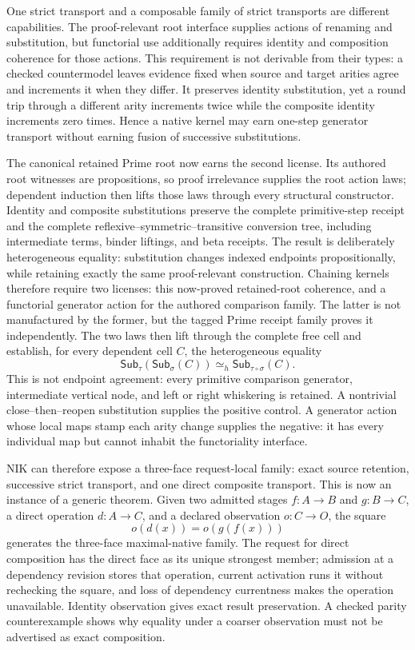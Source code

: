 \documentclass[11pt]{article}
\begin{document}
One strict transport and a composable family of strict transports are
different capabilities.  The proof-relevant root interface supplies actions
of renaming and substitution, but functorial use additionally requires
identity and composition coherence for those actions.  This requirement is
not derivable from their types: a checked countermodel leaves evidence fixed
when source and target arities agree and increments it when they differ.  It
preserves identity substitution, yet a round trip through a different arity
increments twice while the composite identity increments zero times.  Hence a
native kernel may earn one-step generator transport without earning fusion of
successive substitutions.

The canonical retained Prime root now earns the second license.  Its authored
root witnesses are propositions, so proof irrelevance supplies the root action
laws; dependent induction then lifts those laws through every structural
constructor.  Identity and composite substitutions preserve the complete
primitive-step receipt and the complete reflexive--symmetric--transitive
conversion tree, including intermediate terms, binder liftings, and beta
receipts.  The result is deliberately heterogeneous equality: substitution
changes indexed endpoints propositionally, while retaining exactly the same
proof-relevant construction.  Chaining kernels therefore require two licenses:
this now-proved retained-root coherence, and a functorial generator action for
the authored comparison family.  The latter is not manufactured by the former,
but the tagged Prime receipt family proves it independently.  The two laws then
lift through the complete free cell and establish, for every dependent cell
$C$, the heterogeneous equality
\[
  \mathsf{Sub}_{\tau}(\mathsf{Sub}_{\sigma}(C))
  \mathrel{\simeq_{\!h}}
  \mathsf{Sub}_{\tau\circ\sigma}(C).
\]
This is not endpoint agreement: every primitive comparison generator,
intermediate vertical node, and left or right whiskering is retained.  A
nontrivial close--then--reopen substitution supplies the positive control.  A
generator action whose local maps stamp each arity change supplies the negative:
it has every individual map but cannot inhabit the functoriality interface.

NIK can therefore expose a three-face request-local family: exact source
retention, successive strict transport, and one direct composite transport.
This is now an instance of a generic theorem.  Given two admitted stages
$f:A\to B$ and $g:B\to C$, a direct operation $d:A\to C$, and a declared
observation $o:C\to O$, the square
\[
  o(d(x)) = o(g(f(x)))
\]
generates the three-face maximal-native family.  The request for direct
composition has the direct face as its unique strongest member; admission at a
dependency revision stores that operation, current activation runs it without
rechecking the square, and loss of dependency currentness makes the operation
unavailable.  Identity observation gives exact result preservation.  A checked
parity counterexample shows why equality under a coarser observation must not
be advertised as exact composition.
\end{document}
